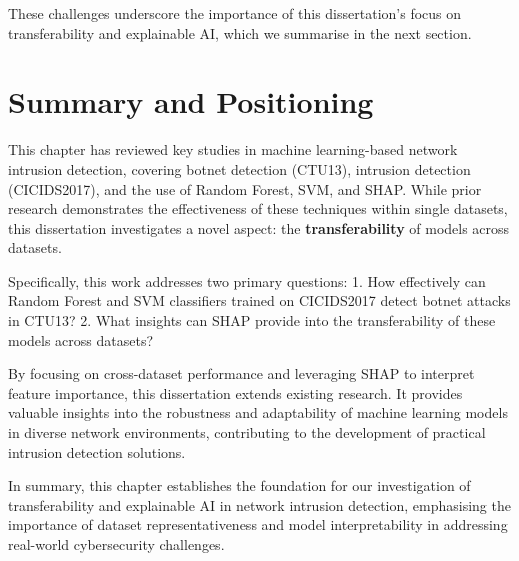 These challenges underscore the importance of this dissertation’s focus on transferability and explainable AI, which we summarise in the next section.

\section{Summary and Positioning}\label{sec:PositioningSummary}

This chapter has reviewed key studies in machine learning-based network intrusion detection, covering botnet detection (CTU13), intrusion detection (CICIDS2017), and the use of Random Forest, SVM, and SHAP. While prior research demonstrates the effectiveness of these techniques within single datasets, this dissertation investigates a novel aspect: the \textbf{transferability} of models across datasets.

Specifically, this work addresses two primary questions:
1. How effectively can Random Forest and SVM classifiers trained on CICIDS2017 detect botnet attacks in CTU13?
2. What insights can SHAP provide into the transferability of these models across datasets?

By focusing on cross-dataset performance and leveraging SHAP to interpret feature importance, this dissertation extends existing research. It provides valuable insights into the robustness and adaptability of machine learning models in diverse network environments, contributing to the development of practical intrusion detection solutions.

In summary, this chapter establishes the foundation for our investigation of transferability and explainable AI in network intrusion detection, emphasising the importance of dataset representativeness and model interpretability in addressing real-world cybersecurity challenges.